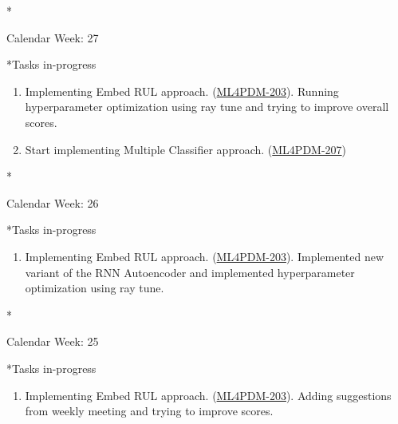 \documentclass[11pt,a4paper]{article}
\begin{document}
\newpage
\begin{section}*{Calendar Week: 27 \hfill \date{9 July, 2021}}
 \begin{refsection}
   \begin{subsection}*{Tasks in-progress}
     \begin{enumerate}
       \item
             Implementing Embed RUL approach. (\href{https://ml4pdm.atlassian.net/browse/ML4PDM-203}{ML4PDM-203}). Running hyperparameter optimization using ray tune and trying to improve overall scores.
       \item
             Start implementing Multiple Classifier approach. (\href{https://ml4pdm.atlassian.net/browse/ML4PDM-207}{ML4PDM-207})
     \end{enumerate}
   \end{subsection}
 \end{refsection}
\end{section}

\newpage
\begin{section}*{Calendar Week: 26 \hfill \date{2 July, 2021}}
 \begin{refsection}
   \begin{subsection}*{Tasks in-progress}
     \begin{enumerate}
       \item
             Implementing Embed RUL approach. (\href{https://ml4pdm.atlassian.net/browse/ML4PDM-203}{ML4PDM-203}). Implemented new variant of the RNN Autoencoder and implemented hyperparameter optimization using ray tune.
     \end{enumerate}
   \end{subsection}
 \end{refsection}
\end{section}

\newpage
\begin{section}*{Calendar Week: 25 \hfill \date{25 June, 2021}}
 \begin{refsection}
   \begin{subsection}*{Tasks in-progress}
     \begin{enumerate}
       \item
             Implementing Embed RUL approach. (\href{https://ml4pdm.atlassian.net/browse/ML4PDM-203}{ML4PDM-203}). Adding suggestions from weekly meeting and trying to improve scores.
     \end{enumerate}
   \end{subsection}
 \end{refsection}
\end{section}
\end{document}
